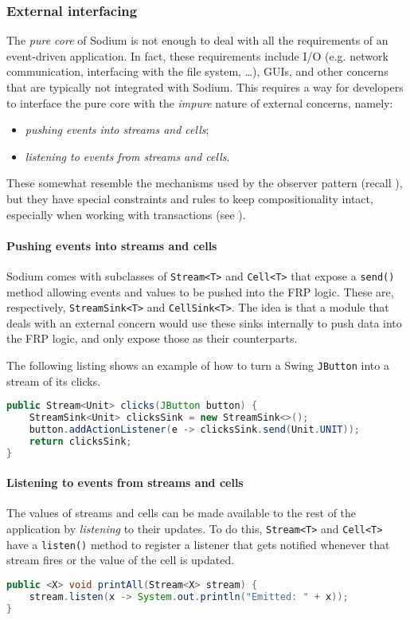 \subsubsection{External interfacing}

The \textit{pure core} of Sodium is not enough to deal with all the requirements of an event-driven application.
%
In fact, these requirements include I/O (e.g. network communication, interfacing with the file system, \dots), GUIs, and other concerns that are typically not integrated with Sodium.
%
This requires a way for developers to interface the pure core with the \textit{impure} nature of external concerns, namely:
%
\begin{itemize}
    \item \textit{pushing events into streams and cells};
    \item \textit{listening to events from streams and cells}.
\end{itemize}
%
These somewhat resemble the mechanisms used by the observer pattern (recall ), but they have special constraints and rules to keep compositionality intact, especially when working with transactions (see ).

\paragraph{Pushing events into streams and cells}
Sodium comes with subclasses of \texttt{Stream<T>} and \texttt{Cell<T>} that expose a \texttt{send()} method allowing events and values to be pushed into the FRP logic.
%
These are, respectively, \texttt{StreamSink<T>} and \texttt{CellSink<T>}.
%
The idea is that a module that deals with an external concern would use these sinks internally to push data into the FRP logic, and only expose those as their  counterparts.

The following listing shows an example of how to turn a Swing \texttt{JButton} into a stream of its clicks.
%
\begin{lstlisting}[frame=single, language=java]
public Stream<Unit> clicks(JButton button) {
    StreamSink<Unit> clicksSink = new StreamSink<>();
    button.addActionListener(e -> clicksSink.send(Unit.UNIT));
    return clicksSink;
}
\end{lstlisting}

\paragraph{Listening to events from streams and cells}
The values of streams and cells can be made available to the rest of the application by \textit{listening} to their updates.
%
To do this, \texttt{Stream<T>} and \texttt{Cell<T>} have a \texttt{listen()} method to register a listener that gets notified whenever that stream fires or the value of the cell is updated.
%
\begin{lstlisting}[frame=single, language=java]
public <X> void printAll(Stream<X> stream) {
    stream.listen(x -> System.out.println("Emitted: " + x));
}
\end{lstlisting}

